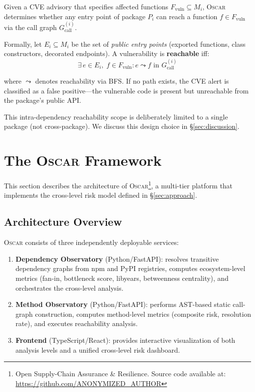\documentclass[conference]{IEEEtran}
\begin{document}
Given a CVE advisory that specifies affected functions $F_{\mathrm{vuln}} \subseteq M_i$, \textsc{Oscar} determines whether any entry point of package $P_i$ can reach a function $f \in F_{\mathrm{vuln}}$ via the call graph $G_{\mathrm{call}}^{(i)}$.

Formally, let $E_i \subseteq M_i$ be the set of \emph{public entry points} (exported functions, class constructors, decorated endpoints). A vulnerability is \textbf{reachable} iff:
\begin{equation}
    \exists\, e \in E_i,\; f \in F_{\mathrm{vuln}} : e \leadsto f \text{ in } G_{\mathrm{call}}^{(i)}
\end{equation}

where $\leadsto$ denotes reachability via BFS. If no path exists, the CVE alert is classified as a false positive—the vulnerable code is present but unreachable from the package's public API.

This intra-dependency reachability scope is deliberately limited to a single package (not cross-package). We discuss this design choice in §\ref{sec:discussion}.

\section{The \textsc{Oscar} Framework}
\label{sec:framework}

This section describes the architecture of \textsc{Oscar}\footnote{Open Supply-Chain Assurance \& Resilience. Source code available at: \url{https://github.com/ANONYMIZED_AUTHOR}}, a multi-tier platform that implements the cross-level risk model defined in §\ref{sec:approach}.

\subsection{Architecture Overview}
\label{subsec:architecture}

\textsc{Oscar} consists of three independently deployable services:

\begin{enumerate}
    \item \textbf{Dependency Observatory} (Python/FastAPI): resolves transitive dependency graphs from npm and PyPI registries, computes ecosystem-level metrics (fan-in, bottleneck score, libyears, betweenness centrality), and orchestrates the cross-level analysis.
    
    \item \textbf{Method Observatory} (Python/FastAPI): performs AST-based static call-graph construction, computes method-level metrics (composite risk, resolution rate), and executes reachability analysis.
    
    \item \textbf{Frontend} (TypeScript/React): provides interactive visualization of both analysis levels and a unified cross-level risk dashboard.
\end{enumerate}
\end{document}
